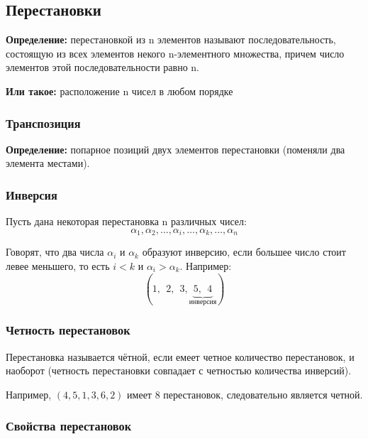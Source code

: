 \documentclass[class=article,a4paper,12pt,crop=false]{standalone}
\begin{document}
  
\subsection{Перестановки}

\textbf{Определение:} перестановкой из n элементов называют
последовательность, состоящую из всех элементов некого n-элементного
множества, причем число элементов этой последовательности равно n.

\textbf{Или такое:} расположение n чисел в любом порядке

\subsubsection{Транспозиция}

\textbf{Определение:} попарное позиций двух элементов перестановки (поменяли два элемента местами).

\subsubsection{Инверсия}

Пусть дана некоторая перестановка n различных чисел:
\begin{equation}
  \alpha_1, \alpha_2, \dots, \alpha_i, \dots, \alpha_k, \dots, \alpha_n
\end{equation}

Говорят, что два числа $\alpha_i$ и $\alpha_k$ образуют инверсию, если
большее число стоит левее меньшего, то есть $i < k$ и $\alpha_i > \alpha_k$.
Например:
\begin{equation}
  (1, \:\: 2, \:\: 3, \underbrace{5, \:\: 4}_{\text{инверсия}})
\end{equation}

\subsubsection{Четность перестановок}

Перестановка называется чётной, если емеет четное количество перестановок,
и наоборот (четность перестановки совпадает с четностью количества инверсий).

Например, $(4, 5, 1, 3, 6, 2)$ имеет 8 перестановок, следовательно является
четной.

\subsubsection{Свойства перестановок}
\end{document}
